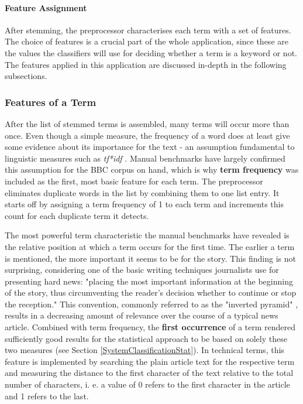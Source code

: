 \documentclass[11pt,a4paper,twoside]{article}
\begin{document}
\paragraph{Feature Assignment} After stemming, the preprocessor characterises each term with a set of features. The choice of features is a crucial part of the whole application, since these are the values the classifiers will use for deciding whether a term is a keyword or not. The features applied in this application are discussed in-depth in the following subsections.

\subsubsection{Features of a Term} \label{SystemPreprocessFeatures}

After the list of stemmed terms is assembled, many terms will occur more than once. Even though a simple measure, the frequency of a word does at least give some evidence about its importance for the text - an assumption fundamental to linguistic measures such as \emph{tf*idf} \cite{Salton1988Term-weightingRetrieval}. Manual benchmarks have largely confirmed this assumption for the BBC corpus on hand, which is why \textbf{term frequency} was included as the first, most basic feature for each term. The preprocessor eliminates duplicate words in the list by combining them to one list entry. It starts off by assigning a term frequency of 1 to each term and increments this count for each duplicate term it detects.

The most powerful term characteristic the manual benchmarks have revealed is the relative position at which a term occurs for the first time. The earlier a term is mentioned, the more important it seems to be for the story. This finding is not surprising, considering one of the basic writing techniques journalists use for presenting hard news: "placing the most important information at the beginning of the story, thus circumventing the reader's decision whether to continue or stop the reception." \cite[p. 501]{Pottker2003NewsAppear} This convention, commonly referred to as the "inverted pyramid" \cite[ibd.]{Pottker2003NewsAppear}, results in a decreasing amount of relevance over the course of a typical news article. Combined with term frequency, the \textbf{first occurrence} of a term rendered sufficiently good results for the statistical approach to be based on solely these two measures (see Section \ref{SystemClassificationStat}). In technical terms, this feature is implemented by searching the plain article text for the respective term and measuring the distance to the first character of the text relative to the total number of characters, i. e. a value of 0 refers to the first character in the article and 1 refers to the last.
\end{document}

